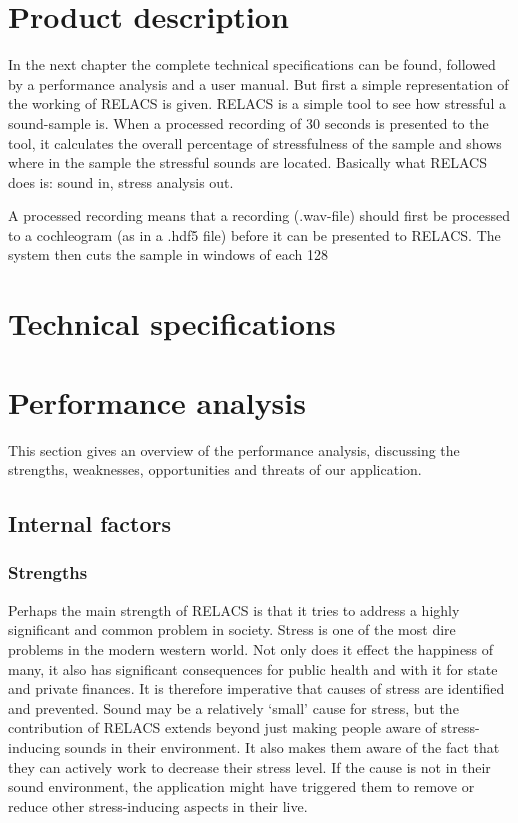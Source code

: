 \documentclass[a4paper]{article}
\begin{document}
\section{Product description}
In the next chapter the complete technical specifications can be found, followed by a performance analysis and a user manual. 
But first a simple representation of the working of RELACS is given. RELACS is a simple tool to see how stressful a sound-sample is. 
When a processed recording of 30 seconds is presented to the tool, it calculates the overall percentage of stressfulness of the sample and shows where in the sample the stressful sounds are located. 
Basically what RELACS does is: sound in, stress analysis out.

A processed recording means that a recording (.wav-file) should first be processed to a cochleogram (as in a .hdf5 file) before it can be presented to RELACS. The system then cuts the sample in windows of each 128

\section{Technical specifications}


\section{Performance analysis}
This section gives an overview of the performance analysis, discussing the strengths, weaknesses, opportunities and threats of our application.

\subsection{Internal factors}
\subsubsection{Strengths}
Perhaps the main strength of RELACS is that it tries to address a highly significant and common problem in society. Stress is one of the most dire problems in the modern western world. Not only does it effect the happiness of many, it also has significant consequences for public health and with it for state and private finances. It is therefore imperative that causes of stress are identified and prevented. Sound may be a relatively `small' cause for stress, but the contribution of RELACS extends beyond just making people aware of stress-inducing sounds in their environment. It also makes them aware of the fact that they can actively work to decrease their stress level. If the cause is not in their sound environment, the application might have triggered them to remove or reduce other stress-inducing aspects in their live.
\end{document}

